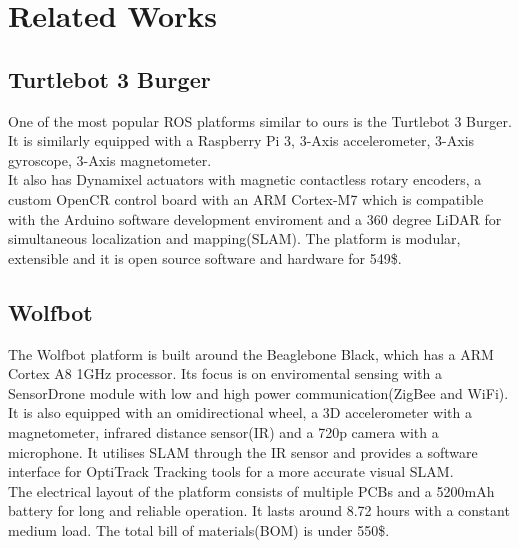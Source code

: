 \documentclass[class=article, crop=false]{standalone}
\begin{document}
\chapter{Related Works}\label{cha:related-works}

\section{Turtlebot 3 Burger}\label{sec:turtlebot3burger}
One of the most popular ROS platforms similar to ours is the Turtlebot 3 Burger\footnotemark. It is similarly equipped with a Raspberry Pi 3, 3-Axis accelerometer, 3-Axis gyroscope, 3-Axis magnetometer. \\
\indent
It also has Dynamixel actuators with magnetic contactless rotary encoders, a custom OpenCR control board with an ARM Cortex-M7 which is compatible with the Arduino software development enviroment and a 360 degree LiDAR for simultaneous localization and mapping(SLAM).
The platform is modular, extensible and it is open source software and hardware for 549\$\cite{turtlebot3}.


\section{Wolfbot}\label{sec:wolfbot}
The Wolfbot\cite{wolfbot} platform is built around the Beaglebone Black, which has a ARM Cortex A8 1GHz processor. Its focus is on enviromental sensing with a SensorDrone module with low and high power communication(ZigBee and WiFi). It is also equipped with an omidirectional wheel, a 3D accelerometer with a magnetometer, infrared distance sensor(IR) and a 720p camera with a microphone. It utilises SLAM through the IR sensor and provides a software interface for OptiTrack Tracking tools for a more accurate visual SLAM. \\
\indent
The electrical layout of the platform consists of multiple PCBs and a 5200mAh battery for long and reliable operation. It lasts around 8.72 hours with a constant medium load. The total bill of materials(BOM) is under 550\$.
\end{document}
